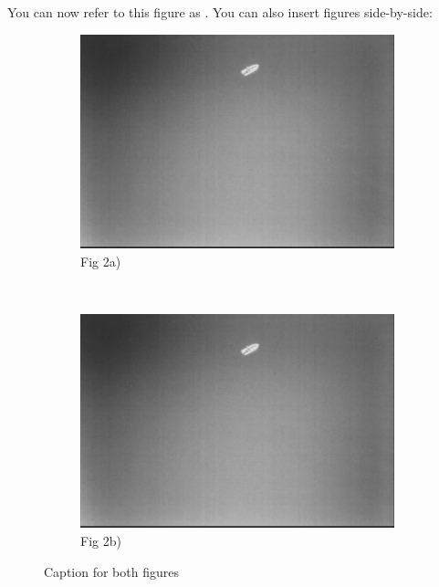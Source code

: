 You can now refer to this figure as . You can also insert figures side-by-side:
\begin{figure}[ht]
	\centering
	\begin{subfigure}[b]{0.45\textwidth}
		\includegraphics[width=\textwidth]{fig1}
		\caption{Fig 2a)}
		\label{fig:2a}
	\end{subfigure}
	~ %
	\begin{subfigure}[b]{0.45\textwidth}
		\includegraphics[width=\textwidth]{fig1}
		\caption{Fig 2b)}
		\label{fig:2b}
	\end{subfigure}
	\caption{Caption for both figures}\label{fig:2}
\end{figure}